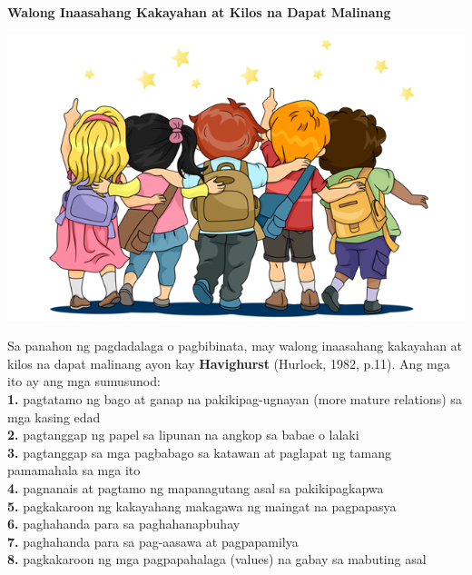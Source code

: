 \documentclass[10pt,a4paper]{article}
\newcommand{\NewsItem}[1]{%
		\usefont{T1}{augie}{m}{n} 	
		\large #1 \vspace{4pt}
		\par \normalsize \normalfont}
\begin{document}
\begin{multicols*}{3}
\vspace{2cm}
\NewsItem{\textbf{Walong Inaasahang Kakayahan at Kilos na Dapat Malinang}}
\begin{center}
			\includegraphics[width=0.8\linewidth]{G7_Modyul_Images/backpack-child-clip-art-student-5a6c1497326783_2412392815170325992065.png}
		\end{center}
	Sa panahon ng pagdadalaga o pagbibinata, may walong inaasahang kakayahan at kilos na dapat malinang ayon kay \textbf{Havighurst }(Hurlock, 1982, p.11). Ang mga ito ay ang mga sumusunod:\\
   \textbf{ 1.} pagtatamo ng bago at ganap na pakikipag-ugnayan (more mature relations) sa mga kasing edad\\
    \textbf{2.} pagtanggap ng papel sa lipunan na angkop sa babae o lalaki\\
    \textbf{3.} pagtanggap sa mga pagbabago sa katawan at paglapat ng tamang pamamahala sa mga ito\\
    \textbf{4.} pagnanais at pagtamo ng mapanagutang asal sa pakikipagkapwa\\
    \textbf{5.} pagkakaroon ng kakayahang makagawa ng maingat na pagpapasya\\
    \textbf{6.} paghahanda para sa paghahanapbuhay\\
    \textbf{7.} paghahanda para sa pag-aasawa at pagpapamilya\\
    \textbf{8.} pagkakaroon ng mga pagpapahalaga (values) na gabay sa mabuting asal\\


\end{multicols*}
\end{document}
